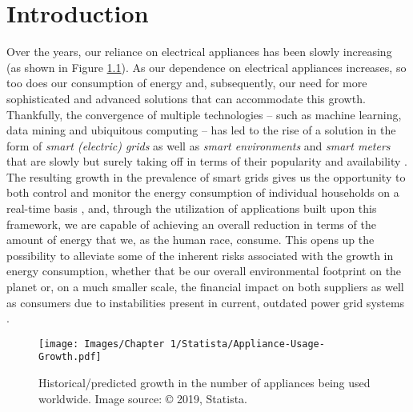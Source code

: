 \chapter{Introduction}
\label{ch:Introduction}
Over the years, our reliance on electrical appliances has been slowly increasing (as shown in Figure \ref{fig:Appliance-Usage-Growth}). As our dependence on electrical appliances increases, so too does our consumption of energy \cite{WBCSD, Yixuan} and, subsequently, our need for more sophisticated and advanced solutions that can accommodate this growth. Thankfully, the convergence of multiple technologies -- such as machine learning, data mining and ubiquitous computing -- has led to the rise of a solution in the form of \textit{smart (electric) grids} as well as \textit{smart environments} and \textit{smart meters} that are slowly but surely taking off in terms of their popularity and availability \cite{Chao}. The resulting growth in the prevalence of smart grids gives us the opportunity to both control and monitor the energy consumption of individual households on a real-time basis \cite{Yildiz}, and, through the utilization of applications built upon this framework, we are capable of achieving an overall reduction in terms of the amount of energy that we, as the human race, consume. This opens up the possibility to alleviate some of the inherent risks associated with the growth in energy consumption, whether that be our overall environmental footprint on the planet or, on a much smaller scale, the financial impact on both suppliers as well as consumers due to instabilities present in current, outdated power grid systems \cite{Hsiao}.

\begin{figure}[hbt!]
    \centering
    \texttt{[image: Images/Chapter 1/Statista/Appliance-Usage-Growth.pdf]}
    \caption{Historical/predicted growth in the number of appliances being used worldwide. Image source: \cite{Statista} © 2019, Statista.}
    \label{fig:Appliance-Usage-Growth}
\end{figure}

